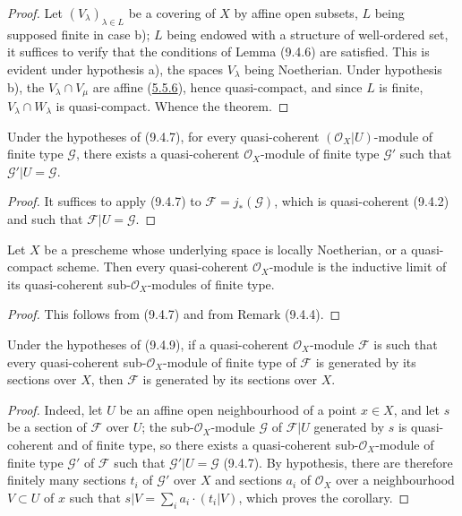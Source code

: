 
\begin{proof}
Let $(V_\lambda)_{\lambda\in L}$ be a covering of $X$ by affine open
subsets, $L$ being supposed finite in case b); $L$ being endowed with a
structure of well-ordered set, it suffices to verify that the conditions
of Lemma (9.4.6) are satisfied. This is evident under hypothesis a), the
spaces $V_\lambda$ being Noetherian. Under hypothesis b), the
$V_\lambda\cap V_\mu$ are affine (\hyperref[I.5.5.6]{5.5.6}), hence
quasi-compact, and since $L$ is finite, $V_\lambda\cap W_\lambda$ is
quasi-compact. Whence the theorem.
\end{proof}

\begin{corollary}[9.4.8]
\label{I.9.4.8}
Under the hypotheses of (9.4.7), for every quasi-coherent
$(\mathscr{O}_X|U)$-module of finite type $\mathscr{G}$, there exists a
quasi-coherent $\mathscr{O}_X$-module of finite type $\mathscr{G}'$ such
that $\mathscr{G}'|U=\mathscr{G}$.
\end{corollary}

\begin{proof}
It suffices to apply (9.4.7) to $\mathscr{F}=j_*(\mathscr{G})$, which is
quasi-coherent (9.4.2) and such that $\mathscr{F}|U=\mathscr{G}$.
\end{proof}

\begin{corollary}[9.4.9]
\label{I.9.4.9}
Let $X$ be a prescheme whose underlying space is locally Noetherian, or
a quasi-compact scheme. Then every quasi-coherent $\mathscr{O}_X$-module is
the inductive limit of its quasi-coherent sub-$\mathscr{O}_X$-modules of
finite type.
\end{corollary}

\begin{proof}
This follows from (9.4.7) and from Remark (9.4.4).
\end{proof}

\begin{corollary}[9.4.10]
\label{I.9.4.10}
Under the hypotheses of (9.4.9), if a quasi-coherent $\mathscr{O}_X$-module
$\mathscr{F}$ is such that every quasi-coherent sub-$\mathscr{O}_X$-module
of finite type of $\mathscr{F}$ is generated by its sections over $X$,
then $\mathscr{F}$ is generated by its sections over $X$.
\end{corollary}

\begin{proof}
Indeed, let $U$ be an affine open neighbourhood of a point $x\in X$, and let
$s$ be a section of $\mathscr{F}$ over $U$; the
sub-$\mathscr{O}_X$-module $\mathscr{G}$ of $\mathscr{F}|U$ generated by
$s$ is quasi-coherent and of finite type, so there exists a
quasi-coherent sub-$\mathscr{O}_X$-module of finite type $\mathscr{G}'$ of
$\mathscr{F}$ such that $\mathscr{G}'|U=\mathscr{G}$ (9.4.7). By hypothesis,
there are therefore finitely many sections $t_i$ of $\mathscr{G}'$ over
$X$ and sections $a_i$ of $\mathscr{O}_X$ over a neighbourhood
$V\subset U$ of $x$ such that
$s|V=\sum_i a_i\mathbin{\cdot}(t_i|V)$, which proves the corollary.
\end{proof}


